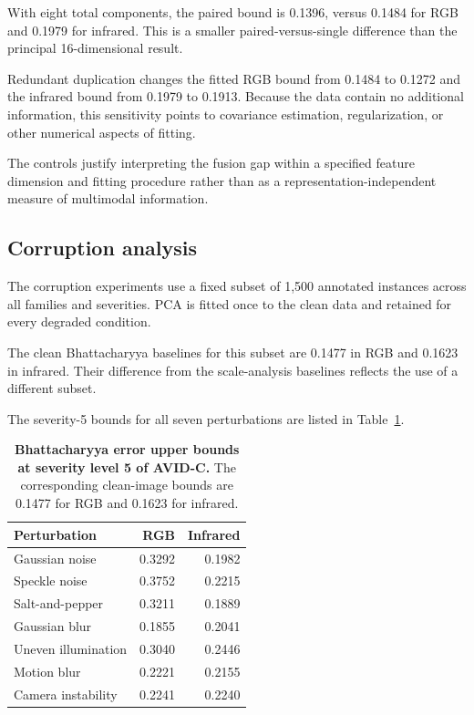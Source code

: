\documentclass[10pt]{article}
\newcommand{\corrupt}{\textsc{AVID-C}}
\begin{document}
With eight total components, the paired bound is 0.1396, versus 0.1484 for RGB and 0.1979 for infrared. This is a smaller paired-versus-single difference than the principal 16-dimensional result.

Redundant duplication changes the fitted RGB bound from 0.1484 to 0.1272 and the infrared bound from 0.1979 to 0.1913. Because the data contain no additional information, this sensitivity points to covariance estimation, regularization, or other numerical aspects of fitting.

The controls justify interpreting the fusion gap within a specified feature dimension and fitting procedure rather than as a representation-independent measure of multimodal information.

\subsection{Corruption analysis}

The corruption experiments use a fixed subset of 1,500 annotated instances across all families and severities. PCA is fitted once to the clean data and retained for every degraded condition.

The clean Bhattacharyya baselines for this subset are 0.1477 in RGB and 0.1623 in infrared. Their difference from the scale-analysis baselines reflects the use of a different subset.

The severity-5 bounds for all seven perturbations are listed in Table~\ref{tab:severityfive}.

\begin{table}[h]
\centering
\caption{\textbf{Bhattacharyya error upper bounds at severity level 5 of \corrupt{}.}
The corresponding clean-image bounds are 0.1477 for RGB and 0.1623 for infrared.}
\label{tab:severityfive}
\small
\begin{tabular}{lrr}
\toprule
Perturbation & RGB & Infrared \\
\midrule
Gaussian noise & 0.3292 & 0.1982 \\
Speckle noise & 0.3752 & 0.2215 \\
Salt-and-pepper & 0.3211 & 0.1889 \\
Gaussian blur & 0.1855 & 0.2041 \\
Uneven illumination & 0.3040 & 0.2446 \\
Motion blur & 0.2221 & 0.2155 \\
Camera instability & 0.2241 & 0.2240 \\
\bottomrule
\end{tabular}
\end{table}
\end{document}
